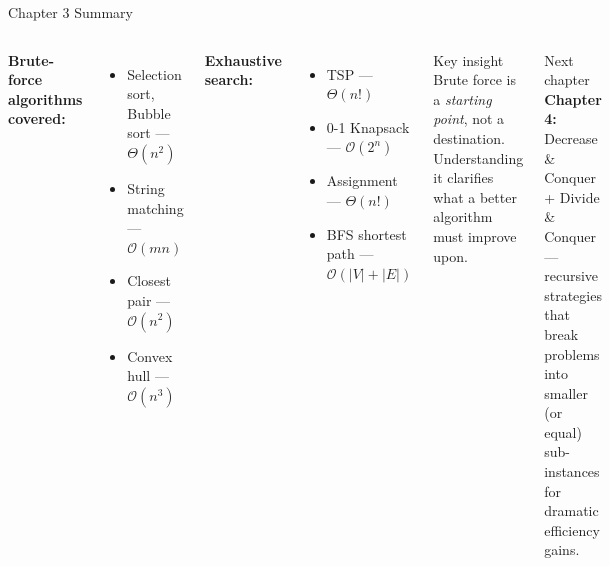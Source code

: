\documentclass[aspectratio=169]{beamer}
\begin{document}
\begin{frame}[shrink=12]{Chapter 3 Summary}
  \begin{columns}[T]
      \textbf{Brute-force algorithms covered:}
      \begin{itemize}
        \item Selection sort, Bubble sort — $\Theta(n^2)$
        \item String matching — $\mathcal{O}(mn)$
        \item Closest pair — $\mathcal{O}(n^2)$
        \item Convex hull — $\mathcal{O}(n^3)$
      \end{itemize}
      \textbf{Exhaustive search:}
      \begin{itemize}
        \item TSP — $\Theta(n!)$
        \item 0-1 Knapsack — $\mathcal{O}(2^n)$
        \item Assignment — $\Theta(n!)$
        \item BFS shortest path — $\mathcal{O}(|V|+|E|)$
      \end{itemize}
      \begin{block}{Key insight}
        Brute force is a \emph{starting point}, not a destination.
        Understanding it clarifies what a better algorithm must
        improve upon.
      \end{block}
      \vspace{0.3em}
      \begin{block}{Next chapter}
        \textbf{Chapter 4:} Decrease \& Conquer + Divide \& Conquer —
        recursive strategies that break problems into smaller
        (or equal) sub-instances for dramatic efficiency gains.
      \end{block}
  \end{columns}
\end{frame}
\end{document}
